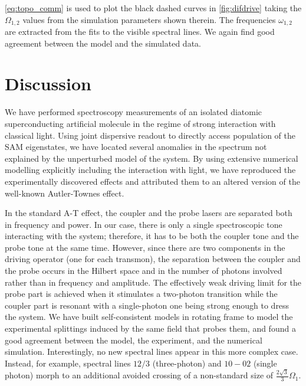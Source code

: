 \documentclass[%
 aps, prx,
 amsmath,amssymb,
 reprint,%
superscriptaddress
]{revtex4-2}
\begin{document}
\autoref{eq:topo_comm} is used to plot the black 
dashed curves in \autoref{fig:difdrive} taking 
the $\Omega_{1,2}$ values from the simulation 
parameters shown therein. The frequencies 
$\omega_{1,2}$ are extracted from the fits to the 
visible spectral lines. We again find good agreement 
between the model and the simulated data.


\section{Discussion}

We have performed spectroscopy measurements of an 
isolated diatomic superconducting artificial 
molecule in the regime of strong interaction 
with classical light. Using joint dispersive 
readout to directly access population of the SAM 
eigenstates, we have located several anomalies in the spectrum not explained 
by the unperturbed model of the system. By 
using extensive numerical modelling explicitly 
including the interaction with light, we have 
reproduced the experimentally discovered effects 
and attributed them to an altered version of the 
well-known Autler-Townes effect.

In the standard A-T effect, the coupler and the 
probe lasers are separated both in frequency and power. 
In our case, there is only a single spectroscopic 
tone interacting with the system; therefore, 
it has to be both the coupler tone and the probe 
tone at the same time. However, since there are 
two components in the driving operator (one for 
each transmon), the separation between the 
coupler and the probe occurs in the Hilbert space and in the number of photons involved 
rather than in frequency and amplitude. The 
effectively weak driving limit for the probe part is 
achieved when it stimulates a two-photon 
transition while the coupler part is resonant 
with a single-photon one being strong enough to dress the 
system. We have built self-consistent models in 
rotating frame to 
model the experimental splittings induced by the 
same field that probes them, and found a good 
agreement between the model, the experiment, and 
the numerical simulation. Interestingly, no new spectral lines appear in this 
more complex case. Instead, for example, spectral 
lines $12/3$ (three-photon) and $10-02$ (single 
photon) morph to an additional avoided crossing of a 
non-standard size of $\frac{2\sqrt{3}}{3} 
\Omega_1$.
\end{document}
